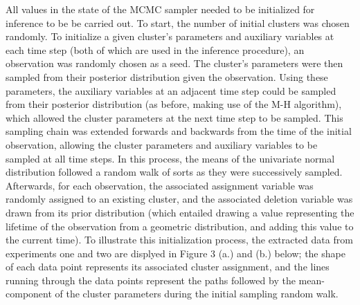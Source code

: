 \documentclass{article}
\begin{document}
All values in the state of the MCMC sampler needed to be initialized for inference to be be carried out. To start, the number of initial clusters was chosen randomly. To initialize a given cluster's parameters and auxiliary variables at each time step (both of which are used in the inference procedure), an observation was randomly chosen as a seed. The cluster's parameters were then sampled from their posterior distribution given the observation. Using these parameters, the auxiliary variables at an adjacent time step could be sampled from their posterior distribution (as before, making use of the M-H algorithm), which allowed the cluster parameters at the next time step to be sampled. This sampling chain was extended forwards and backwards from the time of the initial observation, allowing the cluster parameters and auxiliary variables to be sampled at all time steps. In this process, the means of the univariate normal distribution followed a random walk of sorts as they were successively sampled. Afterwards, for each observation, the associated assignment variable was randomly assigned to an existing cluster, and the associated deletion variable was drawn from its prior distribution (which entailed drawing a value representing the lifetime of the observation from a geometric distribution, and adding this value to the current time). To illustrate this initialization process, the extracted data from experiments one and two are displyed in Figure 3 (a.) and (b.) below; the shape of each data point represents its associated cluster assignment, and the lines running through the data points represent the paths followed by the mean-component of the cluster parameters during the initial sampling random walk.
\end{document}
